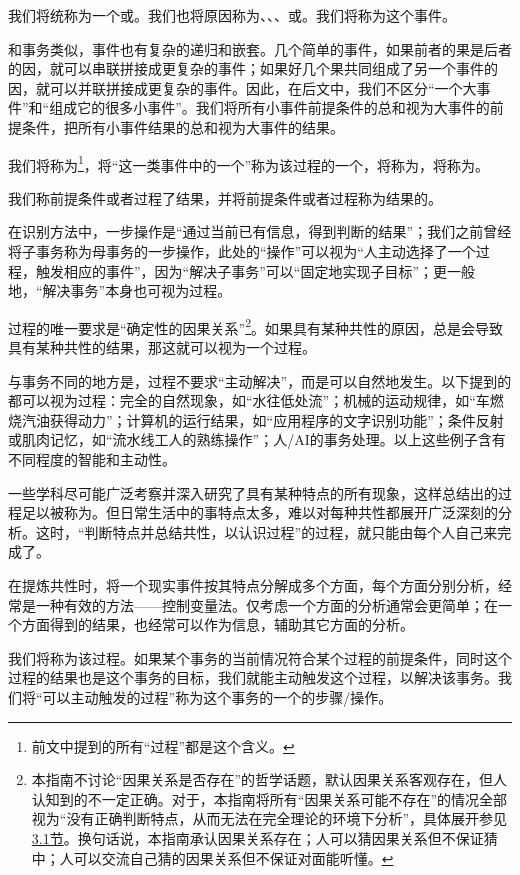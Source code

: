 我们将统称为一个或。我们也将原因称为、、、或。我们将称为这个事件。
\begin{explain}
和事务类似，事件也有复杂的递归和嵌套。几个简单的事件，如果前者的果是后者的因，就可以串联拼接成更复杂的事件；如果好几个果共同组成了另一个事件的因，就可以并联拼接成更复杂的事件。因此，在后文中，我们不区分“一个大事件”和“组成它的很多小事件”。我们将所有小事件前提条件的总和视为大事件的前提条件，把所有小事件结果的总和视为大事件的结果。
\end{explain}
我们将称为\footnote{前文中提到的所有“过程”都是这个含义。}，将“这一类事件中的一个”称为该过程的一个，将称为，将称为。

我们称前提条件或者过程了结果，并将前提条件或者过程称为结果的。
\begin{examples}
在识别方法中，一步操作是“通过当前已有信息，得到判断的结果”；我们之前曾经将子事务称为母事务的一步操作，此处的“操作”可以视为“人主动选择了一个过程，触发相应的事件”，因为“解决子事务”可以“固定地实现子目标”；更一般地，“解决事务”本身也可视为过程。
\end{examples}
过程的唯一要求是“确定性的因果关系”\footnote{本指南不讨论“因果关系是否存在”的哲学话题，默认因果关系客观存在，但人认知到的不一定正确。对于\rigorous，本指南将所有“因果关系可能不存在”的情况全部视为“没有正确判断特点，从而无法在完全理论的环境下分析”，具体展开参见\hyperref[sec:概念与特点]{3.1节}。换句话说，本指南承认因果关系存在；人可以猜因果关系但不保证猜中；人可以交流自己猜的因果关系但不保证对面能听懂。}。如果具有某种共性的原因，总是会导致具有某种共性的结果，那这就可以视为一个过程。
\begin{examples}
    与事务不同的地方是，过程不要求“主动解决”，而是可以自然地发生。以下提到的都可以视为过程：完全的自然现象，如“水往低处流”；机械的运动规律，如“车燃烧汽油获得动力”；计算机的运行结果，如“应用程序的文字识别功能”；条件反射或肌肉记忆，如“流水线工人的熟练操作”；人/AI的事务处理。以上这些例子含有不同程度的智能和主动性。
\end{examples}
一些学科尽可能广泛考察并深入研究了具有某种特点的所有现象，这样总结出的过程足以被称为。但日常生活中的事特点太多，难以对每种共性都展开广泛深刻的分析。这时，“判断特点并总结共性，以认识过程”的过程，就只能由每个人自己来完成了。
\begin{explain}
    在提炼共性时，将一个现实事件按其特点分解成多个方面，每个方面分别分析，经常是一种有效的方法——控制变量法。仅考虑一个方面的分析通常会更简单；在一个方面得到的结果，也经常可以作为信息，辅助其它方面的分析。
\end{explain}
我们将称为该过程。如果某个事务的当前情况符合某个过程的前提条件，同时这个过程的结果也是这个事务的目标，我们就能主动触发这个过程，以解决该事务。我们将“可以主动触发的过程”称为这个事务的一个的步骤/操作。


